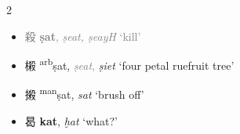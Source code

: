 \begin{multicols}{2}
\raggedcolumns

\begin{minipage}{\columnwidth}
\begin{itemize}[leftmargin=*, labelsep=0.5em]   

  \item \textcolor{gray}{ {\Large{殺}} %
    {\large{\textbf{ṣat}}},
    \textit{ṣeat, ṣeayH} `kill'} %


  \item {\Large{樧}} %
    {\large{{\textsuperscript{arb}}ṣat}},
    \textcolor{gray}{\textit{ṣeat},} \textit{ṣiet} `four petal ruefruit tree' %

  \item {\Large{摋}} %
    {\large{{\textsuperscript{man}}ṣat}},
    \textit{sat} `brush off' %
\end{itemize}
\end{minipage}


\vspace{3mm}
\begin{itemize}

  \item {\Large{曷}} %
    {\large{\textbf{kat}}},
    \textit{ḫat} `what?' %





\end{itemize}
\end{multicols}
